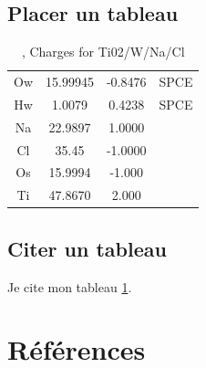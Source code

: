 \documentclass[11pt,a4paper]{article}
\begin{document}
\subsection{Placer un tableau}
\begin{table}[ht]
\begin{tabular}{cccc}\hline
\hline
Ow& 15.99945& -0.8476&SPCE\\
Hw&  1.0079 &  0.4238&SPCE\\
Na& 22.9897 &  1.0000&\\         
Cl& 35.45   & -1.0000&\\
Os& 15.9994 & -1.000 &\\   
Ti& 47.8670 &  2.000 &\\  
\hline 
\end{tabular}                     
\caption{\label{MonTableau}, Charges for Ti02/W/Na/Cl}
\end{table}
\subsection{Citer un tableau}
Je cite mon tableau \ref{MonTableau}.


\section{Références}

\end{document}

